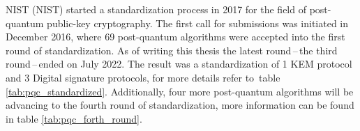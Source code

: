 NIST (\acl{NIST}) started a standardization process in 2017 for the field of post-quantum public-key cryptography. The first call for submissions was initiated in December 2016, where 69 post-quantum algorithms were accepted into the first round of standardization. As of writing this thesis the latest round\,--\,the third round\,--\,ended on July 2022. The result was a standardization of 1 KEM protocol and 3 Digital signature protocols, for more details refer to~table \ref{tab:pqc_standardized}. Additionally, four more post-quantum algorithms will be advancing to the fourth round of standardization, more information can be found in table \ref{tab:pqc_forth_round}. \cite{Alagic2022}

